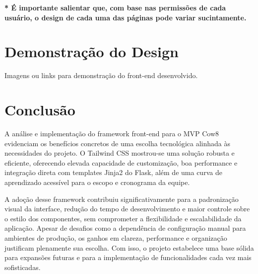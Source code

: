 \documentclass[11pt]{article}
\begin{document}
\textbf{* É importante salientar que, com base nas permissões de cada usuário, o design de cada uma das páginas pode variar sucintamente.}

\section{Demonstração do Design}

Imagens ou links para demonstração do front-end desenvolvido.

\section{Conclusão}

A análise e implementação do framework front-end para o MVP Cow8 evidenciam os benefícios concretos de uma escolha tecnológica alinhada às necessidades do projeto. O Tailwind CSS mostrou-se uma solução robusta e eficiente, oferecendo elevada capacidade de customização, boa performance e integração direta com templates Jinja2 do Flask, além de uma curva de aprendizado acessível para o escopo e cronograma da equipe.

A adoção desse framework contribuiu significativamente para a padronização visual da interface, redução do tempo de desenvolvimento e maior controle sobre o estilo dos componentes, sem comprometer a flexibilidade e escalabilidade da aplicação. Apesar de desafios como a dependência de configuração manual para ambientes de produção, os ganhos em clareza, performance e organização justificam plenamente sua escolha. Com isso, o projeto estabelece uma base sólida para expansões futuras e para a implementação de funcionalidades cada vez mais sofisticadas.

% 
% 
\end{document}

